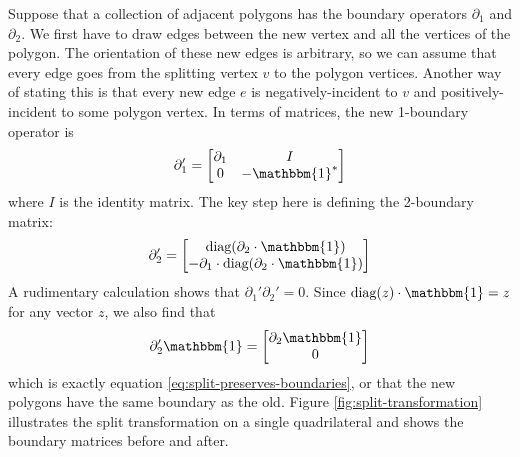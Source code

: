 \documentclass[twocolumn]{article}
\begin{document}
Suppose that a collection of adjacent polygons has the boundary operators $\partial_1$ and $\partial_2$.
We first have to draw edges between the new vertex and all the vertices of the polygon.
The orientation of these new edges is arbitrary, so we can assume that every edge goes from the splitting vertex $v$ to the polygon vertices.
Another way of stating this is that every new edge $e$ is negatively-incident to $v$ and positively-incident to some polygon vertex.
In terms of matrices, the new 1-boundary operator is
\begin{equation}
    \partial_1' = \left[\begin{matrix}\partial_1 & I \\ 0 & -\mathbbm{1}^*\end{matrix}\right]
    \label{eq:split-1-2d}
\end{equation}
where $I$ is the identity matrix.
The key step here is defining the 2-boundary matrix:
\begin{equation}
    \partial_2' = \left[\begin{matrix}\text{diag}(\partial_2\cdot\mathbbm{1}) \\ -\partial_1\cdot\text{diag}(\partial_2\cdot\mathbbm{1})\end{matrix}\right]
\end{equation}
A rudimentary calculation shows that $\partial_1'\partial_2' = 0$.
Since $\text{diag}(z)\cdot\mathbbm{1} = z$ for any vector $z$, we also find that
\begin{equation}
    \partial_2'\mathbbm{1} = \left[\begin{matrix}\partial_2\mathbbm{1} \\ 0\end{matrix}\right]
\end{equation}
which is exactly equation \eqref{eq:split-preserves-boundaries}, or that the new polygons have the same boundary as the old.
Figure \ref{fig:split-transformation} illustrates the split transformation on a single quadrilateral and shows the boundary matrices before and after.
\end{document}

